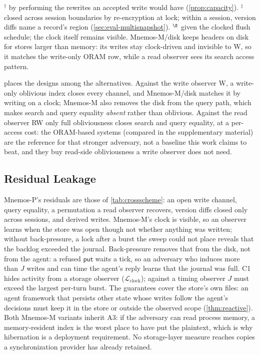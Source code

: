 \begin{table}[t]
\vspace{0.4em}
\begin{minipage}{0.96\textwidth}
\footnotesize
$^\dagger$ by performing the rewrites an accepted write would have (\cref{prop:capacity}).
$^\ddagger$ closed across session boundaries by re-encryption at lock; within a session, version
diffs name a record's region (\cref{sec:eval-multisnapshot}).
$^\S$ given the clocked flush schedule; the clock itself remains visible.
Mnemos-M/disk keeps headers on disk for stores larger than memory: its writes stay clock-driven and
invisible to W, so it matches the write-only ORAM row, while a read observer sees its search access
pattern.
\end{minipage}
\end{table}

 places the designs among the alternatives. Against the write observer W, a
write-only oblivious index closes every channel, and Mnemos-M/disk matches it by writing on a clock;
Mnemos-M also removes the disk from the query path, which makes search and query equality
\emph{absent} rather than oblivious. Against the read observer RW only full obliviousness closes
search and query equality, at a per-access cost: the ORAM-based systems (compared in the
supplementary material) are the reference for that stronger adversary, not a baseline this work
claims to beat, and they buy read-side obliviousness a write observer does not need.

\subsection{Residual Leakage}

Mnemos-P's residuals are those of \cref{tab:crossscheme}: an open write channel, query equality,
a permutation a read observer recovers, version diffs closed only across sessions, and derived
writes. Mnemos-M's
clock is visible, so an observer learns when the store was open though not whether anything was
written; without back-pressure, a lock after a burst the sweep could not place reveals that the
backlog exceeded the journal. Back-pressure removes that from the disk, not from the agent: a
refused $\mathsf{put}$ waits a tick, so an adversary who induces more than $J$ writes and can time
the agent's reply learns that the journal was full. C1 hides activity from a storage observer
($\mathcal{L}_{\mathrm{clock}}$); against a timing observer $J$ must exceed the largest per-turn burst. The guarantees cover the store's own files: an agent framework that
persists other state whose writes follow the agent's decisions must keep it in the store or outside
the observed scope (\cref{thm:reactive}). Both Mnemos-M variants inherit A3: if the adversary can read process memory, a
memory-resident index is the worst place to have put the plaintext, which is why hibernation is a
deployment requirement. No storage-layer measure reaches copies a synchronization provider has
already retained.

